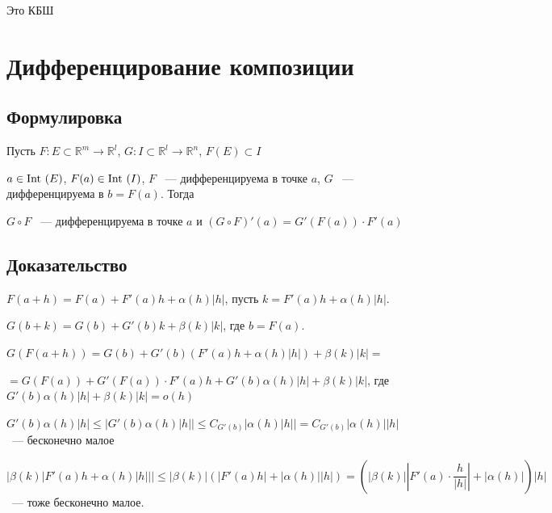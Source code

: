 \documentclass{article}
\begin{document}
            Это КБШ
            
    \newpage
    
    \section{Дифференцирование композиции}
    
        \subsection{Формулировка}
        
            Пусть $F : E \subset \mathbb{R}^m \rightarrow \mathbb{R}^l$, $G : I \subset \mathbb{R}^l \rightarrow \mathbb{R}^n$, $F(E) \subset I$
            
            $a \in \Int (E)$, $F(a) \in \Int (I)$, $F$ ~--- дифференцируема в точке $a$, $G$ ~--- дифференцируема в $b = F(a)$. Тогда
            
            $G \circ F$ ~--- дифференцируема в точке $a$ и $\left( G \circ F \right)'(a) = G'\left( F(a) \right) \cdot F'(a)$
            
        \subsection{Доказательство}
        
            $F(a + h) = F(a) + F'(a)h + \alpha(h) |h|$, пусть $k = F'(a)h + \alpha(h) |h|$.
            
            $G(b + k) = G(b) + G'(b)k + \beta(k) |k|$, где $b = F(a)$.
            
            $G(F(a + h)) = G(b) + G'(b) (F'(a)h + \alpha(h)|h|) + \beta(k) |k| =$
            
            $= G(F(a)) + G'(F(a)) \cdot F'(a)h + G'(b)\alpha(h)|h| + \beta(k) |k|$, где $G'(b)\alpha(h)|h| + \beta(k)|k| = o(h)$
            
            $G'(b)\alpha(h) |h| \leq \left| G'(b) \alpha(h) |h| \right| \leq C_{G'(b)} \left| \alpha(h) |h| \right| = C_{G'(b)} |\alpha(h)| |h|$ ~--- бесконечно малое
            
            $\left| \beta(k) \left| F'(a) h + \alpha(h) |h| \right| \right| \leq |\beta(k)| \left( \left| F'(a) h \right| + |\alpha(h)| |h| \right) = \left( |\beta(k)| \left| F'(a) \cdot \dfrac{h}{|h|} \right| + |\alpha(h)| \right) |h|$ ~--- тоже бесконечно малое.
            
    \newpage
    
\end{document}

